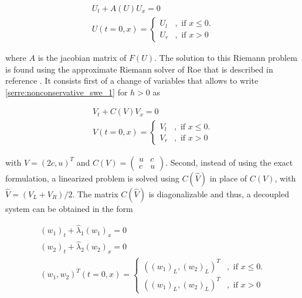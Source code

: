 \documentclass{article}
\begin{document}
\begin{equation}
	\begin{split}
	  U_t + A(U) U_x = 0 \\
	  U(t=0,x) = \begin{cases}
		 U_l &, \text{ if } x\leq 0. \\
		 U_r &, \text{ if } x > 0 
		\end{cases}
	\end{split}
	\label{serre:nonconservative_swe_1}
\end{equation}

\noindent where $A$ is the jacobian matrix of $F(U)$. The solution to this Riemann problem is found using the approximate Riemann solver of Roe that is described in reference \cite{marche2006}. It consists first of a change of variables that allows to write \eqref{serre:nonconservative_swe_1} for $h>0$ as

\begin{equation}
	\begin{split}
	  V_t + C(V)V_x = 0 \\
	  V(t=0,x) = \begin{cases}
		V_l &, \text{ if } x\leq 0. \\
	 V_r &, \text{ if } x > 0 
		\end{cases}
	\end{split}
	\label{serre:nonconservative_swe_2}
\end{equation}

\noindent with $V = (2c,u)^T$ and 
$C(V) = \left( 
\begin{array}{cc} 
u & c \\ 
c & u \end{array}\right)$. Second, instead of using the exact formulation, a linearized problem is solved using $C(\hat V)$ in place of $C(V)$, with $\hat V = (V_L +V_R)/2$. The matrix $C(\hat V)$ is diagonalizable and thus, a decoupled system can be obtained in the form

\begin{equation}
	\begin{split}
		(w_1)_t + \hat \lambda_1 (w_1)_x = 0\\
		(w_2)_t + \hat \lambda_2 (w_2)_x = 0 \\	
	(w_1,w_2)^T(t=0,x) = \begin{cases}
		((w_1)_L,(w_2)_L)^T &, \text{ if } x\leq 0. \\
		((w_1)_L,(w_2)_L)^T &, \text{ if } x > 0 
		\end{cases}
	\end{split}
\end{equation}
\end{document}
